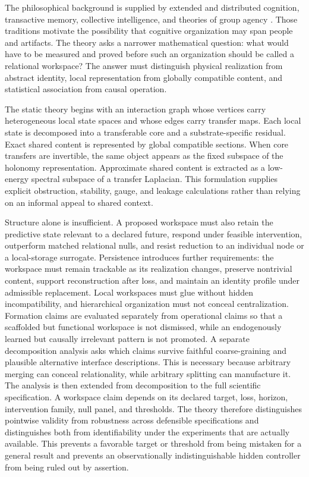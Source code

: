 The philosophical background is supplied by extended and distributed cognition, transactive memory,
collective intelligence, and theories of group agency \cite{Hutchins1995,ClarkChalmers1998,Wegner1987,ListPettit2011}.
Those traditions motivate the possibility that cognitive organization may span people and artifacts.
The theory asks a narrower mathematical question: what would have to be measured and proved
before such an organization should be called a relational workspace? The answer must distinguish
physical realization from abstract identity, local representation from globally compatible content,
and statistical association from causal operation.

The static theory begins with an interaction graph whose vertices carry heterogeneous local state spaces
and whose edges carry transfer maps. Each local state is decomposed into a transferable core and a
substrate-specific residual. Exact shared content is represented by global compatible sections. When
core transfers are invertible, the same object appears as the fixed subspace of the holonomy representation.
Approximate shared content is extracted as a low-energy spectral subspace of a transfer Laplacian.
This formulation supplies explicit obstruction, stability, gauge, and leakage calculations rather than
relying on an informal appeal to shared context.

Structure alone is insufficient. A proposed workspace must also retain the predictive state relevant to
a declared future, respond under feasible intervention, outperform matched relational nulls, and resist
reduction to an individual node or a local-storage surrogate. Persistence introduces further requirements:
the workspace must remain trackable as its realization changes, preserve nontrivial content, support
reconstruction after loss, and maintain an identity profile under admissible replacement. Local workspaces
must glue without hidden incompatibility, and hierarchical organization must not conceal centralization.
Formation claims are evaluated separately from operational claims so that a scaffolded but functional
workspace is not dismissed, while an endogenously learned but causally irrelevant pattern is not promoted.
A separate decomposition analysis asks which claims survive faithful coarse-graining and plausible
alternative interface descriptions. This is necessary because arbitrary merging can conceal relationality,
while arbitrary splitting can manufacture it. The analysis is then extended from decomposition to the full
scientific specification. A workspace claim depends on its declared target, loss, horizon, intervention
family, null panel, and thresholds. The theory therefore distinguishes pointwise validity from robustness
across defensible specifications and distinguishes both from identifiability under the experiments that are
actually available. This prevents a favorable target or threshold from being mistaken for a general result
and prevents an observationally indistinguishable hidden controller from being ruled out by assertion.

